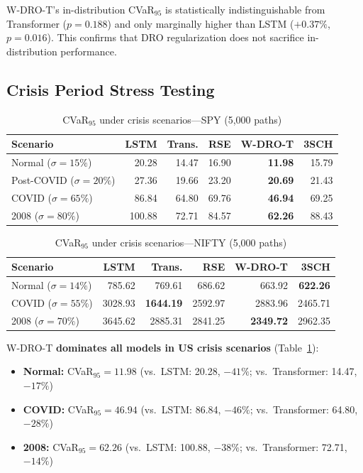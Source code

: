 \documentclass[11pt]{article}
\begin{document}
W-DRO-T's in-distribution CVaR$_{95}$ is statistically indistinguishable from Transformer ($p = 0.188$) and only marginally higher than LSTM ($+0.37\%$, $p = 0.016$). This confirms that DRO regularization does not sacrifice in-distribution performance.

\subsection{Crisis Period Stress Testing}
\label{sec:crisis}

\begin{table}[t]
\centering
\caption{CVaR$_{95}$ under crisis scenarios---SPY (5,000 paths)}
\label{tab:crisis_spy}
\small
\begin{tabular}{lrrrrr}
\toprule
\textbf{Scenario} & \textbf{LSTM} & \textbf{Trans.} & \textbf{RSE} & \textbf{W-DRO-T} & \textbf{3SCH} \\
\midrule
Normal ($\sigma\!=\!15\%$) & 20.28 & 14.47 & 16.90 & \textbf{11.98} & 15.79 \\
Post-COVID ($\sigma\!=\!20\%$) & 27.36 & 19.66 & 23.20 & \textbf{20.69} & 21.43 \\
COVID ($\sigma\!=\!65\%$) & 86.84 & 64.80 & 69.76 & \textbf{46.94} & 69.25 \\
2008 ($\sigma\!=\!80\%$) & 100.88 & 72.71 & 84.57 & \textbf{62.26} & 88.43 \\
\bottomrule
\end{tabular}
\end{table}

\begin{table}[t]
\centering
\caption{CVaR$_{95}$ under crisis scenarios---NIFTY (5,000 paths)}
\label{tab:crisis_nifty}
\small
\begin{tabular}{lrrrrr}
\toprule
\textbf{Scenario} & \textbf{LSTM} & \textbf{Trans.} & \textbf{RSE} & \textbf{W-DRO-T} & \textbf{3SCH} \\
\midrule
Normal ($\sigma\!=\!14\%$) & 785.62 & 769.61 & 686.62 & 663.92 & \textbf{622.26} \\
COVID ($\sigma\!=\!55\%$) & 3028.93 & \textbf{1644.19} & 2592.97 & 2883.96 & 2465.71 \\
2008 ($\sigma\!=\!70\%$) & 3645.62 & 2885.31 & 2841.25 & \textbf{2349.72} & 2962.35 \\
\bottomrule
\end{tabular}
\end{table}

W-DRO-T \textbf{dominates all models in US crisis scenarios} (Table~\ref{tab:crisis_spy}):
\begin{itemize}[noitemsep]
    \item \textbf{Normal:} CVaR$_{95} = 11.98$ (vs.\ LSTM: 20.28, $-41\%$; vs.\ Transformer: 14.47, $-17\%$)
    \item \textbf{COVID:} CVaR$_{95} = 46.94$ (vs.\ LSTM: 86.84, $-46\%$; vs.\ Transformer: 64.80, $-28\%$)
    \item \textbf{2008:} CVaR$_{95} = 62.26$ (vs.\ LSTM: 100.88, $-38\%$; vs.\ Transformer: 72.71, $-14\%$)
\end{itemize}
\end{document}
